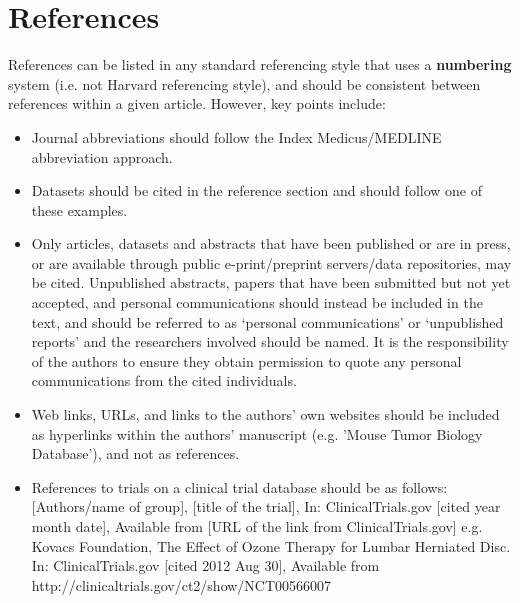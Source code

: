 \section{References}
References can be listed in any standard referencing style that uses a {\bf numbering} system (i.e. not Harvard referencing style), and should be consistent between references within a given article. However, key points include:
\begin{itemize}
\item Journal abbreviations should follow the Index Medicus/MEDLINE abbreviation approach.
\end{itemize}
\begin{itemize}
\item Datasets should be cited in the reference section and should follow one of these examples.
\end{itemize}
\begin{itemize}
\item Only articles, datasets and abstracts that have been published or are in press, or are available through public e-print/preprint servers/data repositories, may be cited. Unpublished abstracts, papers that have been submitted but not yet accepted, and personal communications should instead be included in the text, and should be referred to as ‘personal communications’ or ‘unpublished reports’ and the researchers involved should be named. It is the responsibility of the authors to ensure they obtain permission to quote any personal communications from the cited individuals.
\end{itemize}
\begin{itemize}
\item Web links, URLs, and links to the authors’ own websites should be included as hyperlinks within the authors' manuscript (e.g. 'Mouse Tumor Biology Database'), and not as references.
\end{itemize}
\begin{itemize}
\item References to trials on a clinical trial database should be as follows:
[Authors/name of group], [title of the trial], In: ClinicalTrials.gov [cited year month date], Available from [URL of the link from ClinicalTrials.gov] e.g. Kovacs Foundation, The Effect of Ozone Therapy for Lumbar Herniated Disc. In: ClinicalTrials.gov [cited 2012 Aug 30], Available from http://clinicaltrials.gov/ct2/show/NCT00566007
\end{itemize}
